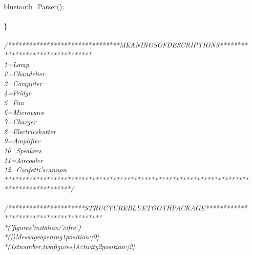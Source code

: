 \documentclass[a4paper, 12pt]{article}
\newcommand\SPC{\hspace*{0.6em}}
\newcommand{\CppAComment}[1]{\textit{\textcolor[rgb]{0.2,0.4,1}{#1}}}
\newcommand{\CppAIdentifier}[1]{\textcolor[rgb]{0,1,0}{#1}}
\newcommand{\CppASpace}[1]{\textcolor[rgb]{1,1,1}{\colorbox[rgb]{0,0,0}{#1}}}
\newcommand{\CppASymbol}[1]{\textcolor[rgb]{1,0,0}{#1}}
\begin{document}
\begin{ttfamily}
\CppASpace{\SPC \SPC }\CppAIdentifier{bluetooth\_Parser}\CppASymbol{(}\CppASymbol{)}\CppASymbol{;}\\
\CppASpace{\SPC \SPC }\\
\CppASymbol{\}}\\
\\
\CppAComment{/********************************MEANINGS\SPC OF\SPC DESCRIPTIONS*********************************}\\
\CppAComment{1\SPC \SPC =\SPC Lamp}\\
\CppAComment{2\SPC \SPC =\SPC Chandelier}\\
\CppAComment{3\SPC \SPC =\SPC Computer}\\
\CppAComment{4\SPC \SPC =\SPC Fridge}\\
\CppAComment{5\SPC \SPC =\SPC Fan}\\
\CppAComment{6\SPC \SPC =\SPC Microwave}\\
\CppAComment{7\SPC \SPC =\SPC Charger}\\
\CppAComment{8\SPC \SPC =\SPC Electric\SPC shutter}\\
\CppAComment{9\SPC \SPC =\SPC Amplifier}\\
\CppAComment{10\SPC =\SPC Speakers}\\
\CppAComment{11\SPC =\SPC Aircooler}\\
\CppAComment{12\SPC =\SPC Confetti's\SPC cannon}\\
\CppAComment{*****************************************************************************************/}\\
\\
\CppAComment{/**********************STRUCTURE\SPC BLUETOOTH\SPC PACKAGE****************************************}\\
\CppAComment{\SPC *\SPC ('figures'\SPC in\SPC italian\SPC :\SPC 'cifre')}\\
\CppAComment{\SPC *\SPC ([)\SPC Message\SPC opening\SPC \SPC \SPC \SPC \SPC \SPC \SPC \SPC \SPC \SPC \SPC \SPC \SPC \SPC \SPC \SPC \SPC \SPC \SPC \SPC \SPC \SPC \SPC \SPC \SPC \SPC \SPC \SPC \SPC \SPC \SPC \SPC \SPC \SPC \SPC \SPC \SPC \SPC \SPC \SPC \SPC \SPC \SPC \SPC \SPC \SPC \SPC \SPC \SPC \SPC \SPC \SPC 1\SPC position\SPC :\SPC [0]}\\
\CppAComment{\SPC *\SPC (1st\SPC number,\SPC two\SPC figures)\SPC Activity\SPC \SPC \SPC \SPC \SPC \SPC \SPC \SPC \SPC \SPC \SPC \SPC \SPC \SPC \SPC \SPC \SPC \SPC \SPC \SPC \SPC \SPC \SPC \SPC \SPC \SPC \SPC \SPC \SPC \SPC \SPC \SPC \SPC \SPC \SPC \SPC \SPC 2\SPC position\SPC :\SPC [2]}\\

\end{ttfamily}
\end{document}
